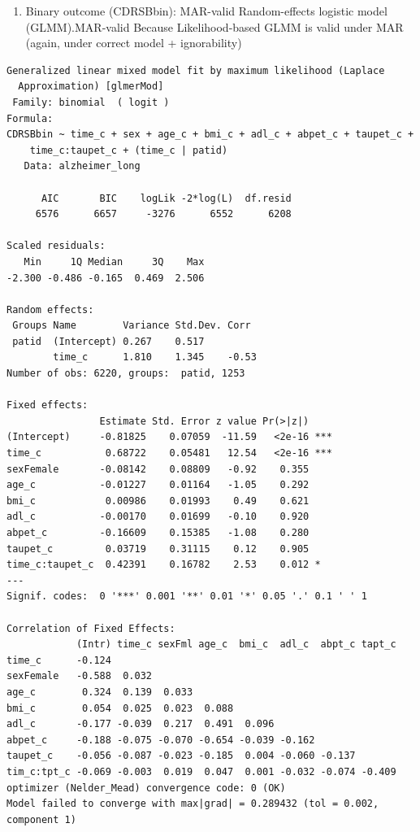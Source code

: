 \documentclass[
  11pt,
  letterpaper,
  DIV=11,
  numbers=noendperiod]{scrartcl}
\providecommand{\tightlist}{%
  \setlength{\itemsep}{0pt}\setlength{\parskip}{0pt}}\usepackage{longtable,booktabs,array}
\begin{document}
\begin{enumerate}
\def\labelenumi{\arabic{enumi}.}
\setcounter{enumi}{1}
\tightlist
\item
  Binary outcome (CDRSBbin): MAR-valid Random-effects logistic model
  (GLMM).MAR-valid Because Likelihood-based GLMM is valid under MAR
  (again, under correct model + ignorability)
\end{enumerate}

\begin{verbatim}
Generalized linear mixed model fit by maximum likelihood (Laplace
  Approximation) [glmerMod]
 Family: binomial  ( logit )
Formula: 
CDRSBbin ~ time_c + sex + age_c + bmi_c + adl_c + abpet_c + taupet_c +  
    time_c:taupet_c + (time_c | patid)
   Data: alzheimer_long

      AIC       BIC    logLik -2*log(L)  df.resid 
     6576      6657     -3276      6552      6208 

Scaled residuals: 
   Min     1Q Median     3Q    Max 
-2.300 -0.486 -0.165  0.469  2.506 

Random effects:
 Groups Name        Variance Std.Dev. Corr 
 patid  (Intercept) 0.267    0.517         
        time_c      1.810    1.345    -0.53
Number of obs: 6220, groups:  patid, 1253

Fixed effects:
                Estimate Std. Error z value Pr(>|z|)    
(Intercept)     -0.81825    0.07059  -11.59   <2e-16 ***
time_c           0.68722    0.05481   12.54   <2e-16 ***
sexFemale       -0.08142    0.08809   -0.92    0.355    
age_c           -0.01227    0.01164   -1.05    0.292    
bmi_c            0.00986    0.01993    0.49    0.621    
adl_c           -0.00170    0.01699   -0.10    0.920    
abpet_c         -0.16609    0.15385   -1.08    0.280    
taupet_c         0.03719    0.31115    0.12    0.905    
time_c:taupet_c  0.42391    0.16782    2.53    0.012 *  
---
Signif. codes:  0 '***' 0.001 '**' 0.01 '*' 0.05 '.' 0.1 ' ' 1

Correlation of Fixed Effects:
            (Intr) time_c sexFml age_c  bmi_c  adl_c  abpt_c tapt_c
time_c      -0.124                                                 
sexFemale   -0.588  0.032                                          
age_c        0.324  0.139  0.033                                   
bmi_c        0.054  0.025  0.023  0.088                            
adl_c       -0.177 -0.039  0.217  0.491  0.096                     
abpet_c     -0.188 -0.075 -0.070 -0.654 -0.039 -0.162              
taupet_c    -0.056 -0.087 -0.023 -0.185  0.004 -0.060 -0.137       
tim_c:tpt_c -0.069 -0.003  0.019  0.047  0.001 -0.032 -0.074 -0.409
optimizer (Nelder_Mead) convergence code: 0 (OK)
Model failed to converge with max|grad| = 0.289432 (tol = 0.002, component 1)
\end{verbatim}
\end{document}
